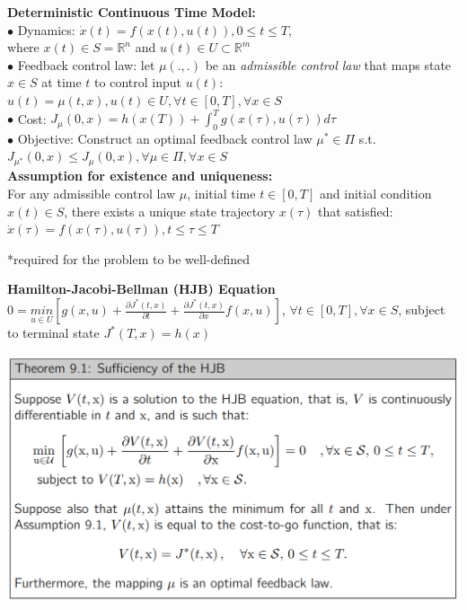 \documentclass[10pt,landscape]{article}
\newenvironment{Figure}
{\par\medskip\noindent\minipage{\linewidth}}
{\endminipage\par\medskip}
\begin{document}
\begin{multicols*}{4}
\textbf{Deterministic Continuous Time Model:}\\
$\bullet$ Dynamics: $\dot{x}(t) = f(x(t),u(t)), 0 \leq t \leq T$,\\
where $x(t) \in S=\mathbb{R}^n$ and $u(t)\in U \subset \mathbb{R}^m$\\
$\bullet$ Feedback control law: let $\mu(.,.)$ be an \textit{admissible control law} that maps state $x \in S$ at time $t$ to control input $u(t)$: $u(t) = \mu (t,x), u(t)\in U, \forall t \in [0,T], \forall x\in S$\\
$\bullet$ Cost: $J_{\mu}(0,x) = h(x(T)) + \int_{0}^{T}g(x(\tau),u(\tau)) d\tau$\\
$\bullet$ Objective: Construct an optimal feedback control law $\mu^{*} \in \Pi$ s.t. $J_{\mu^{*}} (0,x) \leq J_{\mu} (0,x), \forall \mu \in \Pi, \forall x \in S$\\

\textbf{Assumption for existence and uniqueness: }\\
For any admissible control law $\mu$, initial time $t \in [0,T]$  and initial condition $x(t) \in S$, there exists a unique state trajectory $x(\tau)$ that satisfied: $\dot{x}(\tau) = f(x(\tau),u(\tau)), t \leq \tau \leq T$

*required for the problem to be well-defined

\textbf{Hamilton-Jacobi-Bellman (HJB) Equation}\\
$ 0 = \underset{u \in U}{min} [g(x,u) + \frac{\partial J^{*}(t,x)}{\partial t} + \frac{\partial J^{*}(t,x)}{\partial x}f(x,u)]$, $\forall t \in [0,T], \forall x \in S$, subject to terminal state $J^{*}(T,x) = h(x)$\\

\begin{Figure}
	\centering
	\includegraphics[width=\linewidth]{pictures/HJB.png}
\end{Figure}


\end{multicols*}
\end{document}
